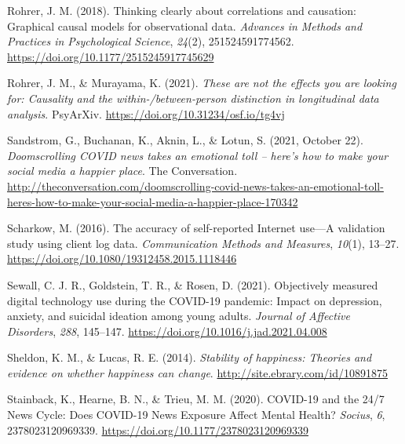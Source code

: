 \documentclass[
  man,floatsintext]{apa7}
\newlength{\cslhangindent}
\newlength{\cslentryspacingunit} %
\newenvironment{CSLReferences}[2] %
 {%
  \setlength{\parindent}{0pt}
  \ifodd #1
  \let\oldpar\par
  \def\par{\hangindent=\cslhangindent\oldpar}
  \fi
  \setlength{\parskip}{#2\cslentryspacingunit}
 }%
 {}
\begin{document}
\begin{CSLReferences}{1}{0}
\leavevmode{}%
Rohrer, J. M. (2018). Thinking clearly about correlations and causation: {Graphical} causal models for observational data. \emph{Advances in Methods and Practices in Psychological Science}, \emph{24}(2), 251524591774562. \url{https://doi.org/10.1177/2515245917745629}

\leavevmode{}%
Rohrer, J. M., \& Murayama, K. (2021). \emph{These are not the effects you are looking for: {Causality} and the within-/between-person distinction in longitudinal data analysis}. {PsyArXiv}. \url{https://doi.org/10.31234/osf.io/tg4vj}

\leavevmode{}%
Sandstrom, G., Buchanan, K., Aknin, L., \& Lotun, S. (2021, October 22). \emph{Doomscrolling {COVID} news takes an emotional toll -- here's how to make your social media a happier place}. {The Conversation}. \url{http://theconversation.com/doomscrolling-covid-news-takes-an-emotional-toll-heres-how-to-make-your-social-media-a-happier-place-170342}

\leavevmode{}%
Scharkow, M. (2016). The accuracy of self-reported {Internet} use---{A} validation study using client log data. \emph{Communication Methods and Measures}, \emph{10}(1), 13--27. \url{https://doi.org/10.1080/19312458.2015.1118446}

\leavevmode{}%
Sewall, C. J. R., Goldstein, T. R., \& Rosen, D. (2021). Objectively measured digital technology use during the {COVID-19} pandemic: {Impact} on depression, anxiety, and suicidal ideation among young adults. \emph{Journal of Affective Disorders}, \emph{288}, 145--147. \url{https://doi.org/10.1016/j.jad.2021.04.008}

\leavevmode{}%
Sheldon, K. M., \& Lucas, R. E. (2014). \emph{Stability of happiness: Theories and evidence on whether happiness can change}. \url{http://site.ebrary.com/id/10891875}

\leavevmode{}%
Stainback, K., Hearne, B. N., \& Trieu, M. M. (2020). {COVID-19} and the 24/7 {News Cycle}: {Does COVID-19 News Exposure Affect Mental Health}? \emph{Socius}, \emph{6}, 2378023120969339. \url{https://doi.org/10.1177/2378023120969339}


\end{CSLReferences}
\end{document}
